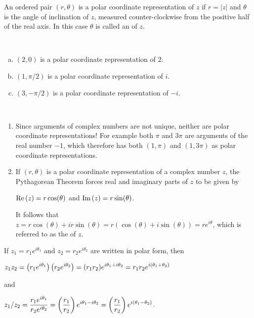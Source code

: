 \documentclass[11pt,fleqn,dvipsnames,usenames]{article}
\begin{document}
\begin{definition}
An ordered pair $(r,\theta)$ is a polar coordinate representation of $z$ if $r = |z|$ and $\theta$ is the angle of inclination of $z$, measured counter-clockwise from the positive half of the real axis.  In this case $\theta$ is called an  of $z$.
\end{definition}
%
\begin{examples}~
\begin{enumerate}[(a)]
\item $(2,0)$ is a polar coordinate representation of $2$.
\item $(1,\pi/2)$ is a polar coordinate representation of $i$.
\item $(3,-\pi/2)$ is a polar coordinate representation of $-i$.
\end{enumerate}
\end{examples}
%
\begin{remarks}~
\begin{enumerate}[(1)]
\item Since arguments of complex numbers are not unique, neither are polar coordinate representations!  For example both $\pi$ and $3\pi$ are arguments of the real number $-1$, which therefore has both $(1,\pi)$ and $(1,3\pi)$ as polar coordinate representations.
\item If $(r,\theta)$ is a polar coordinate representation of a complex number $z$, the Pythagorean Theorem forces real and imaginary parts of $z$ to be given by
\begin{center}
$\text{Re}\left(z\right) = r\cos(\theta)$ and $\text{Im}\left(z\right) = r\sin(\theta)$.
\end{center}
It follows that $z = r\cos(\theta) + ir\sin(\theta) = r(\cos(\theta) + i\sin(\theta)) = re^{i\theta}$, which is referred to as the  of $z$.
\end{enumerate}
\end{remarks}
\newpage

\observation If $z_{1} = r_{1}e^{i\theta_{1}}$ and $z_{2} = r_{2}e^{i\theta_{2}}$ are written in polar form, then
\begin{center}
$\displaystyle{z_{1}z_{2} = \left(r_{1}e^{i\theta_{1}}\right)\left(r_{2}e^{i\theta_{2}}\right) = (r_{1}r_{2})e^{i\theta_{1} + i\theta_{2}} = r_{1}r_{2}e^{i(\theta_{1} +\theta_{2})}}$
\end{center}
and
\begin{center}
$\displaystyle{z_{1}/z_{2} = \frac{r_{1}e^{i\theta_{1}}}{r_{2}e^{i\theta_{2}}} = \left(\frac{r_{1}}{r_{2}}\right)e^{i\theta_{1} - i\theta_{2}} = \left(\frac{r_{1}}{r_{2}}\right)e^{i(\theta_{1} - \theta_{2})}}$.
\end{center}
\vsp
\end{document}
